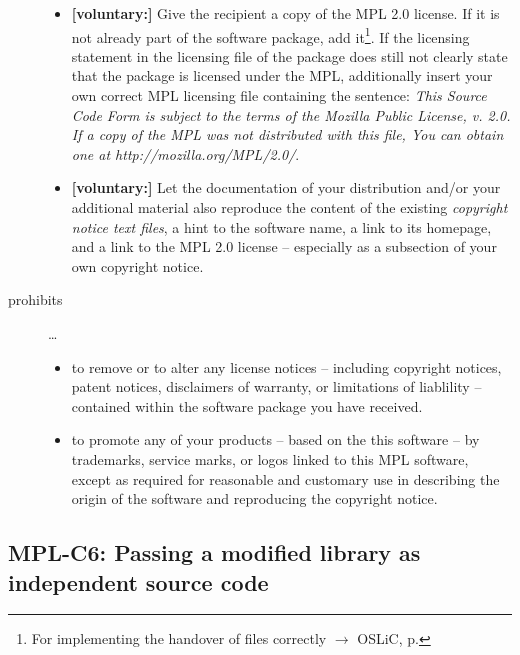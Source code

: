 \begin{description}
\begin{itemize}
  \item \textbf{[voluntary:]} Give the recipient a copy of the MPL 2.0 license.
  If it is not already part of the software package, add it\footnote{For
  implementing the handover of files correctly $\rightarrow$ OSLiC, p.
  \pageref{DistributingFilesHint}}. If the licensing statement in the licensing
  file of the package does still not clearly state that the package is licensed
  under the MPL, additionally insert your own correct MPL licensing file
  containing the sentence: \emph{This Source Code Form is subject to the terms
  of the Mozilla Public License, v. 2.0. If a copy of the MPL was not
  distributed with this file, You can obtain one at
  http://mozilla.org/MPL/2.0/}.
 
  \item \textbf{[voluntary:]} Let the documentation of your distribution and/or
  your additional material  also reproduce the content of the existing
  \emph{copyright notice text files}, a hint to the software name, a link to its
  homepage, and a link to the MPL 2.0 license -- especially as a subsection of
  your own copyright notice.

\end{itemize}  

\item[prohibits] \ldots
\begin{itemize}
  \item to remove or to alter any license notices -- including copyright
  notices, patent notices, disclaimers of warranty, or limitations of liablility
  -- contained within the software package you have received.
  \item to promote any of your products -- based on the this software -- by
  trademarks, service marks, or logos linked to this MPL software, except as 
  required for reasonable and customary use in describing the origin
  of the software and reproducing the  copyright notice.
\end{itemize}

\end{description}

\subsection{MPL-C6: Passing a modified library as independent source code}
\label{OSUC-08S-MPL}

